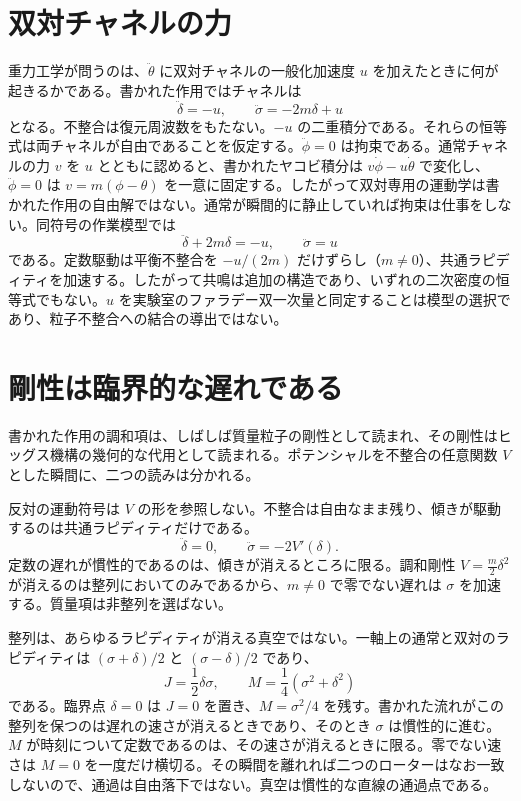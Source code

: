 \documentclass[a4paper]{article}
\begin{document}
\section{双対チャネルの力}

重力工学が問うのは、\(\ddot\theta\) に双対チャネルの一般化加速度 \(u\) を加えたときに何が起きるかである。書かれた作用ではチャネルは
\begin{equation}
\ddot\delta=-u,\qquad \ddot\sigma=-2m\delta+u
\end{equation}
となる。不整合は復元周波数をもたない。\(-u\) の二重積分である。それらの恒等式は両チャネルが自由であることを仮定する。\(\ddot\phi=0\) は拘束である。通常チャネルの力 \(v\) を \(u\) とともに認めると、書かれたヤコビ積分は \(v\dot\phi-u\dot\theta\) で変化し、\(\ddot\phi=0\) は \(v=m(\phi-\theta)\) を一意に固定する。したがって双対専用の運動学は書かれた作用の自由解ではない。通常が瞬間的に静止していれば拘束は仕事をしない。同符号の作業模型では
\begin{equation}
\ddot\delta+2m\delta=-u,\qquad \ddot\sigma=u
\end{equation}
である。定数駆動は平衡不整合を \(-u/(2m)\) だけずらし（\(m\neq 0\)）、共通ラピディティを加速する。したがって共鳴は追加の構造であり、いずれの二次密度の恒等式でもない。\(u\) を実験室のファラデー双一次量と同定することは模型の選択であり、粒子不整合への結合の導出ではない。

\section{剛性は臨界的な遅れである}

書かれた作用の調和項は、しばしば質量粒子の剛性として読まれ、その剛性はヒッグス機構の幾何的な代用として読まれる。ポテンシャルを不整合の任意関数 \(V\) とした瞬間に、二つの読みは分かれる。

反対の運動符号は \(V\) の形を参照しない。不整合は自由なまま残り、傾きが駆動するのは共通ラピディティだけである。
\[
\ddot\delta=0,\qquad\ddot\sigma=-2V'(\delta).
\]
定数の遅れが慣性的であるのは、傾きが消えるところに限る。調和剛性 \(V=\frac m2\delta^2\) が消えるのは整列においてのみであるから、\(m\neq 0\) で零でない遅れは \(\sigma\) を加速する。質量項は非整列を選ばない。

整列は、あらゆるラピディティが消える真空ではない。一軸上の通常と双対のラピディティは \((\sigma+\delta)/2\) と \((\sigma-\delta)/2\) であり、
\[
J=\frac12\delta\sigma,\qquad M=\frac14(\sigma^2+\delta^2)
\]
である。臨界点 \(\delta=0\) は \(J=0\) を置き、\(M=\sigma^2/4\) を残す。書かれた流れがこの整列を保つのは遅れの速さが消えるときであり、そのとき \(\sigma\) は慣性的に進む。\(M\) が時刻について定数であるのは、その速さが消えるときに限る。零でない速さは \(M=0\) を一度だけ横切る。その瞬間を離れれば二つのローターはなお一致しないので、通過は自由落下ではない。真空は慣性的な直線の通過点である。
\end{document}
